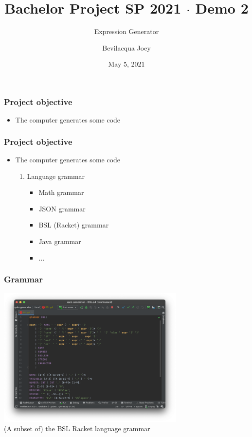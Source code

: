 \documentclass[t,aspectratio=1610]{beamer}
\title{Bachelor Project SP 2021 $ \cdot $ Demo 2}
\subtitle{Expression Generator}
\author{Bevilacqua Joey}
\institute{Universit\`a della Svizzera Italiana}
\date{May 5, 2021}
\begin{document}
\begin{frame}
\maketitle
\end{frame}

\begin{frame}
\frametitle{Project objective}
\begin{itemize}
\item The computer generates some code
\end{itemize}
\end{frame}

\begin{frame}
\frametitle{Project objective}
\begin{itemize}
\item The computer generates some code
	  \begin{enumerate}
	  \item Language grammar
			\begin{itemize}
			\item Math grammar
			\item JSON grammar
			\item BSL (Racket) grammar
			\item Java grammar
			\item $ \dots $
			\end{itemize}
	  \end{enumerate}
\end{itemize}
\end{frame}

\begin{frame}
\frametitle{Grammar}
\begin{center}
	\includegraphics[width=0.7\textwidth]{img/grammar_bsl} \\
	{(A subset of) the BSL Racket language grammar}
\end{center}
\end{frame}
\end{document}

